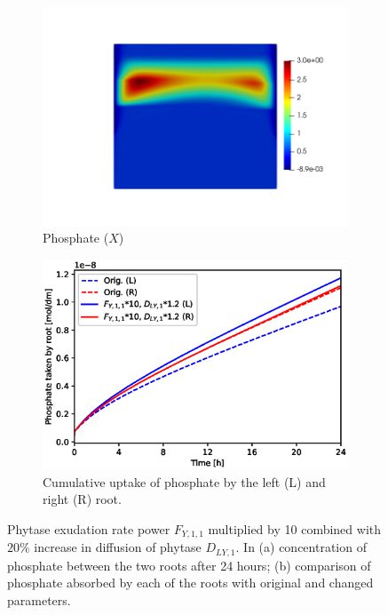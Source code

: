 \documentclass[11pt]{article}
\numberwithin{equation}{section}
\begin{document}
\begin{figure}[!htb]
\centering
\begin{subfigure}[t]{0.45\textwidth}
    \includegraphics[trim= 100 100 60 100,width=\textwidth]{Figures/X_Fy11times10Y1up20pc.png}
    \caption{Phosphate ($X$)}
\end{subfigure}
\qquad
\begin{subfigure}[t]{0.45\textwidth}
    \includegraphics[width=\textwidth]{Figures/Fy11times10DY1up20pc.eps}
    \caption{Cumulative uptake of phosphate by the left (L) and right (R) root.}
\end{subfigure}

\caption{Phytase exudation rate power $F_{Y,1,1}$ multiplied by 10 combined with $20\%$ increase in diffusion of phytase $D_{LY,1}$. In (a) concentration of phosphate between the two roots after 24 hours; (b) comparison of phosphate absorbed by each of the roots with original and changed parameters.}
\end{figure}
\end{document}
